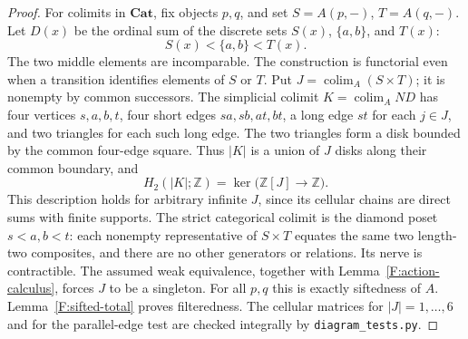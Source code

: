 \documentclass[11pt,a4paper]{article}
\theoremstyle{definition}
\theoremstyle{remark}
\newcommand{\Cat}{\mathbf{Cat}}
\newcommand{\colim}{\operatorname*{colim}}
\begin{document}
\begin{proof}
For colimits in $\Cat$, fix objects $p,q$, and set
$S=A(p,-)$, $T=A(q,-)$.  Let $D(x)$ be the ordinal sum of the
discrete sets $S(x)$, $\{a,b\}$, and $T(x)$:
\[
                 S(x)<\{a,b\}<T(x).
\]
The two middle elements are incomparable.  The construction is
functorial even when a transition identifies elements of $S$ or $T$.
Put $J=\colim_A(S\times T)$; it is nonempty by common successors.
The simplicial colimit $K=\colim_A ND$ has four vertices
$s,a,b,t$, four short edges $sa,sb,at,bt$, a long edge $st$ for
each $j\in J$, and two triangles for each such long edge.  The two
triangles form a disk bounded by the common four-edge square.
Thus $|K|$ is a union of $J$ disks along their common boundary,
and
\[
 H_2(|K|;\mathbb Z)=\ker\bigl(\mathbb Z[J]\longrightarrow\mathbb Z\bigr).
\]
This description holds for arbitrary infinite $J$, since its cellular
chains are direct sums with finite supports.  The strict categorical
colimit is the diamond poset $s<a,b<t$: each nonempty representative
of $S\times T$ equates the same two length-two composites, and there
are no other generators or relations.  Its nerve is contractible.
The assumed weak equivalence, together with
Lemma~\ref{F:action-calculus}, forces $J$ to be a singleton.
For all $p,q$ this is exactly siftedness of $A$.
Lemma~\ref{F:sifted-total} proves filteredness.
The cellular matrices for $|J|=1,\ldots,6$ and for the parallel-edge
test are checked integrally by \texttt{diagram\_tests.py}.
\end{proof}
\end{document}
